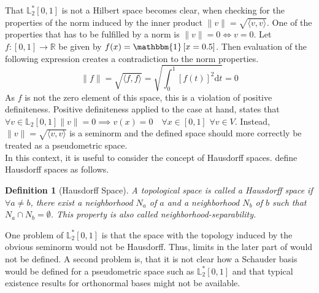 \documentclass[12pt, a4paper]{article}
\theoremstyle{MAstyle} \newtheorem{assumption}{Assumption}[section]
\theoremstyle{MAstyle} \newtheorem{definition}{Definition}[section]
\theoremstyle{MAstyle} \newtheorem{theorem}{Theorem}[section]
\begin{document}
		That $\mathbb{L}^{*}_2[0,1]$ is not a Hilbert space becomes clear, when checking for the properties of the norm induced by the inner product $\| v \| = \sqrt{\langle v, v\rangle}$.
		One of the properties that has to be fulfilled by a norm is $\| v \| = 0 \Longleftrightarrow v = 0$.			
		Let $f:[0,1] \rightarrow \mathbb{R}$ be given by $f(x) = \mathbbm{1}\left[x = 0.5\right]$. Then evaluation of the following expression creates a contradiction to the norm properties.
		\begin{equation}
			\| f \| = \sqrt{\langle f, f\rangle} = \sqrt{\int_{0}^{1} \left[f(t)\right]^2\mathrm{d}t } = 0
		\end{equation}
		As $f$ is not the zero element of this space, this is a violation of positive definiteness. Positive definiteness applied to the case at hand, states that $\forall v \in \mathbb{L}_2[0,1] \| v \| = 0 \implies v(x) = 0 \quad \forall x \in [0,1]$  $\forall v \in V$. Instead, $\| v \| = \sqrt{\langle v, v\rangle}$ is a seminorm and the defined space should more correctly be treated as a pseudometric space.\\
		
		In this context, it is useful to consider the concept of Hausdorff spaces. \cite{richmond_general_2020} define Hausdorff spaces as follows.
		\begin{definition}[Hausdorff Space]
			A topological space is called a Hausdorff space if $\forall a \neq b$, there exist a neighborhood $N_a$ of $a$ and a neighborhood $N_b$ of $b$ such that $N_a \cap N_b = \emptyset$. This property is also called neighborhood-separability.
		\end{definition}
		
		One problem of $\mathbb{L}^{*}_2[0,1]$ is that the space with the topology induced by the obvious seminorm would not be Hausdorff. Thus, limits in the later part of \cite{bugni_permutation_2021} would not be defined.
		A second problem is, that it is not clear how a Schauder basis would be defined for a pseudometric space such as $\mathbb{L}^{*}_2[0,1]$ and that typical existence results for orthonormal bases might not be available.\\				
		
		\newpage
\end{document}
